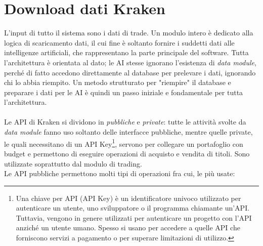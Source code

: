 \documentclass[a4paper,12pt]{report}
\begin{document}
\section{Download dati Kraken}
L'input di tutto il sistema sono i dati di trade. Un modulo intero è dedicato alla logica di scaricamento dati, il cui fine è soltanto fornire i suddetti dati alle intelligenze artificiali, che rappresentano la parte principale del software. Tutta l'architettura è orientata al dato; le AI stesse ignorano l'esistenza di \textit{data module}, perché di fatto accedono direttamente al database per prelevare i dati, ignorando chi lo abbia riempito. Un metodo strutturato per "riempire" il database e preparare i dati per le AI è quindi un passo iniziale e fondamentale per tutta l'architettura.\\~\\
Le API di Kraken si dividono in \textit{pubbliche} e \textit{private}: tutte le attività svolte da \textit{data module} fanno uso soltanto delle interfacce pubbliche, mentre quelle private, le quali necessitano di un API Key\footnote{Una chiave per API (API Key) è un identificatore univoco utilizzato per autenticare un utente, uno sviluppatore o il programma chiamante un'API. Tuttavia, vengono in genere utilizzati per autenticare un progetto con l'API anziché un utente umano. Spesso si usano per accedere a quelle API che forniscono servizi a pagamento o per superare limitazioni di utilizzo.}, servono per collegare un portafoglio con budget e permettono di eseguire operazioni di acquisto e vendita di titoli. Sono utilizzate soprattutto dal modulo di trading.\\
Le API pubbliche permettono molti tipi di operazioni fra cui, le più usate:
\end{document}
